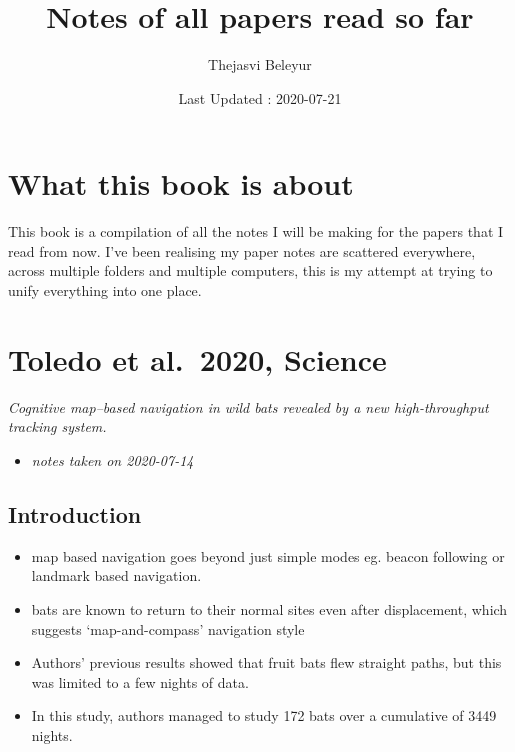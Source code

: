 \documentclass[
]{book}
\title{Notes of all papers read so far}
\author{Thejasvi Beleyur}
\date{Last Updated : 2020-07-21}
\providecommand{\tightlist}{%
  \setlength{\itemsep}{0pt}\setlength{\parskip}{0pt}}
\begin{document}
\maketitle

{
\setcounter{tocdepth}{1}
\tableofcontents
}
\hypertarget{what-this-book-is-about}{%
\chapter*{What this book is about}\label{what-this-book-is-about}}

This book is a compilation of all the notes I will be making for the papers that I read from now.
I've been realising my paper notes are scattered everywhere, across multiple folders and multiple computers,
this is my attempt at trying to unify everything into one place.

\hypertarget{toledo-et-al.-2020-science}{%
\chapter{Toledo et al.~2020, Science}\label{toledo-et-al.-2020-science}}


\emph{Cognitive map--based navigation in wild bats revealed by a new high-throughput tracking system.} \citep{toledo2020cognitive}

\begin{itemize}
\tightlist
\item
  \emph{notes taken on 2020-07-14}
\end{itemize}

\hypertarget{introduction}{%
\section{Introduction}\label{introduction}}

\begin{itemize}
\tightlist
\item
  map based navigation goes beyond just simple modes eg. beacon following or landmark based navigation.
\item
  bats are known to return to their normal sites even after displacement, which suggests `map-and-compass' navigation style
\item
  Authors' previous results showed that fruit bats flew straight paths, but this was limited to a few nights of data.
\item
  In this study, authors managed to study 172 bats over a cumulative of 3449 nights.
\end{itemize}
\end{document}
